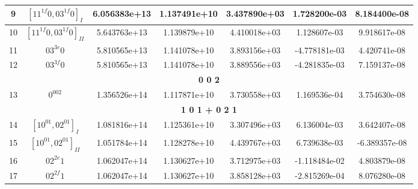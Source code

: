 \begin{table}[h!]
\begin{tabular}{|c|c|c|c|c|c|c|}
9 & $[11^{1f}0, 03^{1f}0]_{I}$ & 6.056383e+13 & 1.137491e+10 & 3.437890e+03 & 1.728200e-03 & 8.184400e-08 \\ \hline
10 & $[11^{1f}0, 03^{1f}0]_{II}$ & 5.643763e+13 & 1.139879e+10 & 4.410018e+03 & 1.128607e-03 & 9.918617e-08 \\ \hline
11 & $03^{3e}0$ & 5.810565e+13 & 1.141078e+10 & 3.893156e+03 & -4.778181e-03 & 4.420741e-08 \\ \hline
12 & $03^{3f}0$ & 5.810565e+13 & 1.141078e+10 & 3.889556e+03 & -4.281835e-03 & 7.159137e-08 \\ \hline
\multicolumn{7}{|c|}{\textbf{0 0 2}} \\ \hline
13 & $0^002$ & 1.356526e+14 & 1.117871e+10 & 3.730558e+03 & 1.169536e-04 & 3.754630e-08 \\ \hline
\multicolumn{7}{|c|}{\textbf{1 0 1 + 0 2 1}} \\ \hline
14 & $[10^01, 02^01]_{I}$ & 1.081816e+14 & 1.125361e+10 & 3.307496e+03 & 6.136004e-03 & 3.642407e-08 \\ \hline
15 & $[10^01, 02^01]_{II}$ & 1.051784e+14 & 1.128278e+10 & 4.439767e+03 & 6.739638e-03 & -6.389357e-08 \\ \hline
16 & $02^{2e}1$ & 1.062047e+14 & 1.130627e+10 & 3.712975e+03 & -1.118484e-02 & 4.803879e-08 \\ \hline
17 & $02^{2f}1$ & 1.062047e+14 & 1.130627e+10 & 3.858128e+03 & -2.815269e-04 & 8.076280e-08 \\ \hline
\end{tabular}
\end{table}



